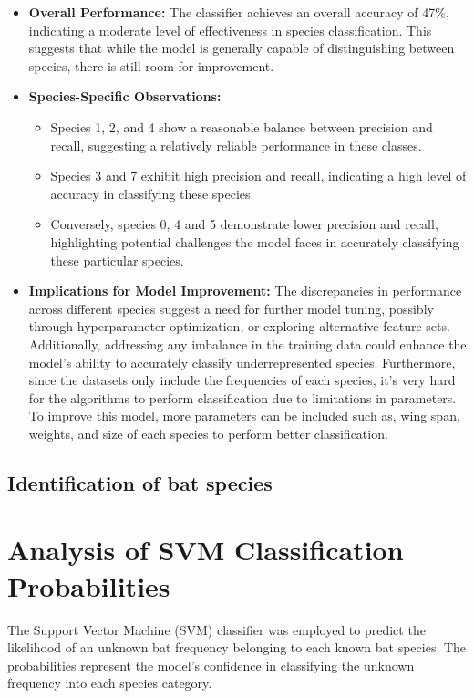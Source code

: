 \documentclass[twocolumn]{article}[ht]
\begin{document}
\begin{itemize}
    \item \textbf{Overall Performance:} The classifier achieves an overall accuracy of 47\%, indicating a moderate level of effectiveness in species classification. This suggests that while the model is generally capable of distinguishing between species, there is still room for improvement.

    \item \textbf{Species-Specific Observations:}
    \begin{itemize}
        \item Species 1, 2, and 4 show a reasonable balance between precision and recall, suggesting a relatively reliable performance in these classes.
        \item Species 3 and 7 exhibit high precision and recall, indicating a high level of accuracy in classifying these species.
        \item Conversely, species 0, 4 and 5 demonstrate lower precision and recall, highlighting potential challenges the model faces in accurately classifying these particular species.
    \end{itemize}
    \item \textbf{Implications for Model Improvement:} The discrepancies in performance across different species suggest a need for further model tuning, possibly through hyperparameter optimization, or exploring alternative feature sets. Additionally, addressing any imbalance in the training data could enhance the model's ability to accurately classify underrepresented species. Furthermore, since the datasets only include the frequencies of each species, it's very hard for the algorithms to perform classification due to limitations in parameters. To improve this model, more parameters can be included such as, wing span, weights, and size of each species to perform better classification.
\end{itemize}


\subsection*{Identification of bat species}
\section{Analysis of SVM Classification Probabilities}

The Support Vector Machine (SVM) classifier was employed to predict the likelihood of an unknown bat frequency belonging to each known bat species. The probabilities represent the model's confidence in classifying the unknown frequency into each species category.
\end{document}
